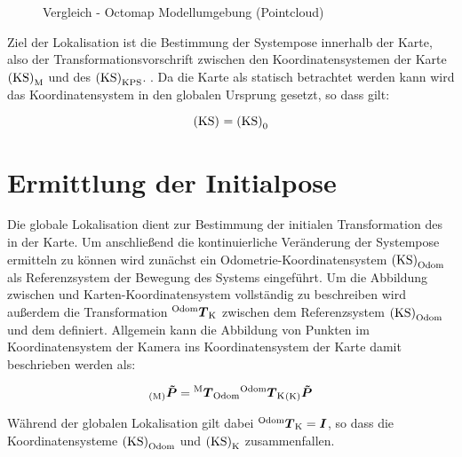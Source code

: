 \begin{figure}[!ht]
	\begin{center}
	\hspace{5mm}
	\caption{Vergleich - Octomap Modellumgebung (Pointcloud)}
	\label{fig.octomap}
	\end{center}
\end{figure}

Ziel der Lokalisation ist die Bestimmung der Systempose innerhalb der Karte, also der Transformationsvorschrift zwischen den Koordinatensystemen der Karte ${\mathrm{(KS)}}_{\mathrm{M}}$ und des  ${\mathrm{(KS)}}_{\mathrm{KPS}}$. . Da die Karte als statisch betrachtet werden kann wird das Koordinatensystem in den globalen Ursprung gesetzt, so dass gilt:

\begin{equation}
{\mathrm{(KS)}}_{\mathrm{}} = {\mathrm{(KS)}}_{\mathrm{0}}
\end{equation}


\section{Ermittlung der Initialpose}
\label{chap.globloc}
Die globale Lokalisation dient zur Bestimmung der initialen Transformation des  in der Karte. Um anschließend die kontinuierliche Veränderung der Systempose ermitteln zu können wird zunächst ein Odometrie-Koordinatensystem ${\mathrm{(KS)}}_{\mathrm{Odom}}$ als Referenzsystem der Bewegung des Systems eingeführt. Um die Abbildung zwischen \red[Kamera-] und Karten-Koordinatensystem vollständig zu beschreiben wird außerdem die Transformation ${^{\mathrm{Odom}}\mbox{\boldmath{$T$}}_{\mathrm{K}}}$ zwischen dem Referenzsystem ${\mathrm{(KS)}}_{\mathrm{Odom}}$ und dem  definiert. Allgemein kann die Abbildung von Punkten im Koordinatensystem der Kamera ins Koordinatensystem der Karte damit beschrieben werden als:

\begin{equation}
{_{{\mathrm{(M)}}}}\mbox{\boldmath{$\tilde{P}$}} = {^{\mathrm{M}}\mbox{\boldmath{$T$}}_{\mathrm{Odom}}}{^{\mathrm{Odom}}\mbox{\boldmath{$T$}}_{\mathrm{K}}}{_{{\mathrm{(K)}}}}\mbox{\boldmath{$\tilde{P}$}}
\label{eq.globloc}
\end{equation}

Während der globalen Lokalisation gilt dabei ${^{\mathrm{Odom}}\mbox{\boldmath{$T$}}_{\mathrm{K}}} = \mbox{\boldmath{$I$}}$, so dass die Koordinatensysteme ${\mathrm{(KS)}}_{\mathrm{Odom}}$ und ${\mathrm{(KS)}}_{\mathrm{K}}$ zusammenfallen.\\

